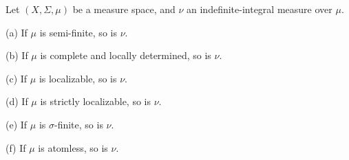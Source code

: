 

Let $(X,\Sigma,\mu)$ be a measure space, and
$\nu$ an indefinite-integral measure over $\mu$.

(a) If $\mu$ is semi-finite, so is $\nu$.

(b) If $\mu$ is complete and locally determined, so is $\nu$.

(c) If $\mu$ is localizable, so is $\nu$.

(d) If $\mu$ is strictly localizable, so is $\nu$.

(e) If $\mu$ is $\sigma$-finite, so is $\nu$.

(f) If $\mu$ is atomless, so is $\nu$.


